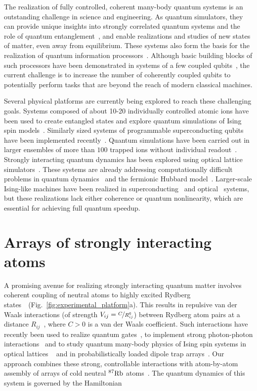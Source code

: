 \documentclass[prl,nobalancelastpage,twocolumn,superscriptaddress,nofootinbib]{revtex4}
\newcommand{\Rb}{\ensuremath{^{87}{\rm Rb}}\xspace}
\begin{document}
The realization of fully controlled, coherent many-body quantum systems is an
outstanding challenge in science and engineering. As quantum simulators,
they can provide unique insights into strongly correlated quantum systems and
the role of quantum entanglement~\cite{Bloch2012}, and enable realizations and
studies of new states of matter, even away from equilibrium. These systems also
form the basis for the realization of quantum information
processors~\cite{Ladd2010}. Although basic building blocks of such processors have
been demonstrated in systems of a few coupled
qubits~\cite{Monroe2013,Devoret2013,Awschalom2013}, the current challenge is to
increase the number of coherently coupled qubits to potentially perform tasks
that are beyond the reach of modern classical machines.

Several physical platforms are currently being explored to reach these
challenging goals. Systems composed of about 10-20 individually controlled
atomic ions have been used to create entangled states and explore quantum
simulations of Ising spin models~\cite{Monz2011,Islam2013}. Similarly sized
systems of programmable superconducting qubits have been implemented
recently~\cite{Song2017}.  Quantum simulations have been carried out in larger
ensembles of more than $100$ trapped ions without individual
readout~\cite{Gaerttner2017}. Strongly interacting quantum dynamics has been
explored using optical lattice simulators~\cite{Kuhr2016}. These systems are
already addressing computationally difficult problems in quantum
dynamics~\cite{Trotzky2012} and the fermionic Hubbard
model~\cite{Mazurenko2017}. Larger-scale Ising-like machines have been realized
in superconducting~\cite{Ronnow2014} and optical~\cite{McMahon2016} systems, but
these realizations lack either coherence or quantum nonlinearity, which are
essential for achieving full quantum speedup.

\section{Arrays of strongly interacting atoms}

A promising avenue for realizing strongly interacting quantum matter involves
coherent coupling of neutral atoms to highly excited Rydberg
states~\cite{Jaksch2000,Weimer2010_b}~(Fig.~\ref{fig:experimental_platform}a).
This results in repulsive van der Waals interactions
(of strength $V_{ij}=\nicefrac{C}{R_{ij}^6}$) between Rydberg atom pairs at a
distance $R_{ij}$~\cite{Jaksch2000}, where $C>0$ is a van der Waals
coefficient. Such interactions have recently been used to realize quantum
gates~\cite{Wilk2010,Isenhower2010,Saffman2016}, to implement strong
photon-photon interactions~\cite{Pritchard2010} and to study quantum many-body
physics of Ising spin systems in optical lattices
~\cite{Schauss2012,Schauss2015,Zeiher2017} and in probabilistically loaded
dipole trap arrays~\cite{Labuhn2016}. Our approach combines these strong,
controllable interactions with atom-by-atom assembly of arrays of cold neutral
\Rb atoms~\cite{Barredo2016,Endres2016,Kim2016}. The quantum dynamics of this
system is governed by the Hamiltonian
\end{document}
